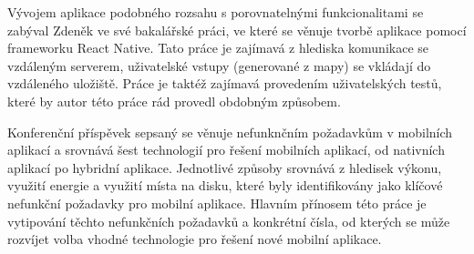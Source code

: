 Vývojem aplikace podobného rozsahu s porovnatelnými funkcionalitami se zabýval Zdeněk  \textcite{Tomka2018thesis} ve své bakalářské práci, ve které se věnuje tvorbě aplikace pomocí frameworku React Native. Tato práce je zajímavá z hlediska komunikace se vzdáleným serverem, uživatelské vstupy (generované z mapy) se vkládají do vzdáleného uložiště. Práce je taktéž zajímavá provedením uživatelských testů, které by autor této práce rád provedl obdobným způsobem.

Konferenční příspěvek sepsaný \textcite{caseres2019study} se věnuje nefunknčním požadavkům v mobilních aplikací a srovnává šest technologií pro řešení mobilních aplikací, od nativních aplikací po hybridní aplikace. Jednotlivé způsoby srovnává z hledisek výkonu, využití energie a využití místa na disku, které byly identifikovány jako klíčové nefunkční požadavky pro mobilní aplikace. Hlavním přínosem této práce je vytipování těchto nefunkčních požadavků a konkrétní čísla, od kterých se může rozvíjet volba vhodné technologie pro řešení nové mobilní aplikace.
